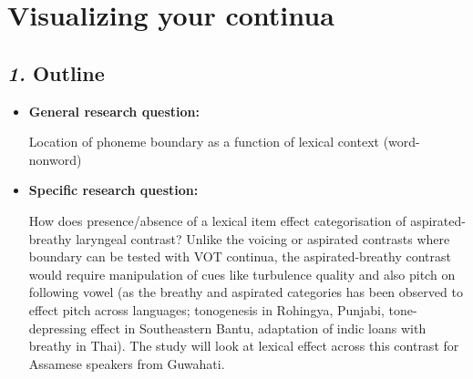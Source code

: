 \documentclass[12pt, english]{article}
\newcommand{\mysection}[2]{\setcounter{section}{#1}\addtocounter{section}{-1}\section{#2}}
\begin{document}

\mysection{8}{Visualizing your continua}
\vspace{10pt}

\subsection*{\emph{1.} Outline}
\vspace{10pt}

\begin{itemize}
    \item \textbf{General research question:} \par
    Location of phoneme boundary as a function of lexical context (word-nonword)
    \item \textbf{Specific research question:} \par
    How does presence/absence of a lexical item effect categorisation of aspirated-breathy laryngeal contrast? Unlike the voicing or aspirated contrasts where boundary can be tested with VOT continua, the aspirated-breathy contrast would require manipulation of cues like turbulence quality and also pitch on following vowel (as the breathy and aspirated categories has been observed to effect pitch across languages; tonogenesis in Rohingya, Punjabi, tone-depressing effect in Southeastern Bantu, adaptation of indic loans with breathy in Thai). The study will look at lexical effect across this contrast for Assamese speakers from Guwahati.   
\end{itemize}
\end{document}
